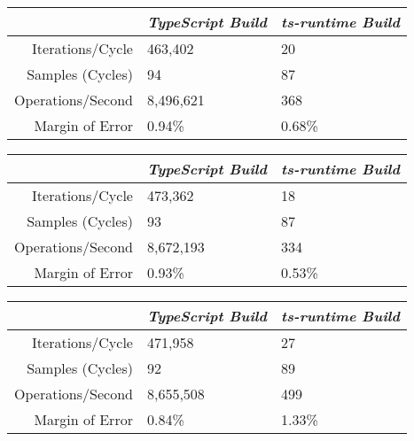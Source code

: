 \begin{center}
{
\centering
\tabulinesep=1.2mm
\setlength{\tabcolsep}{5mm}
\def\arraystretch{1.25}
\small
\begin{tabu} to \textwidth {|r||X[c,m]|X[c,m]|}
  \hline
  & \emph{TypeScript Build} & \emph{ts-runtime Build} \\
  \hline
  \hline
  Iterations/Cycle  & 463,402 & 20 \\
  \hline
  Samples (Cycles)  & 94 & 87 \\
  \hline
  Operations/Second & 8,496,621 & 368 \\
  \hline
  Margin of Error   & 0.94\% & 0.68\% \\
  \hline
\end{tabu}
}
\end{center}

\begin{center}
{
\centering
\tabulinesep=1.2mm
\setlength{\tabcolsep}{5mm}
\def\arraystretch{1.25}
\small
\begin{tabu} to \textwidth {|r||X[c,m]|X[c,m]|}
  \hline
  & \emph{TypeScript Build} & \emph{ts-runtime Build} \\
  \hline
  \hline
  Iterations/Cycle  & 473,362 & 18 \\
  \hline
  Samples (Cycles)  & 93 & 87 \\
  \hline
  Operations/Second & 8,672,193 & 334 \\
  \hline
  Margin of Error   & 0.93\% & 0.53\% \\
  \hline
\end{tabu}
}
\end{center}

\begin{center}
{
\centering
\tabulinesep=1.2mm
\setlength{\tabcolsep}{5mm}
\def\arraystretch{1.25}
\small
\begin{tabu} to \textwidth {|r||X[c,m]|X[c,m]|}
  \hline
  & \emph{TypeScript Build} & \emph{ts-runtime Build} \\
  \hline
  \hline
  Iterations/Cycle  & 471,958 & 27 \\
  \hline
  Samples (Cycles)  & 92 & 89 \\
  \hline
  Operations/Second & 8,655,508 & 499 \\
  \hline
  Margin of Error   & 0.84\% & 1.33\% \\
  \hline
\end{tabu}
}
\end{center}

